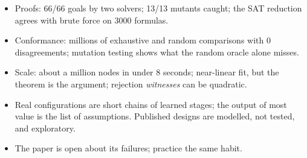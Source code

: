 \begin{recap}
\begin{itemize}
\item Proofs: 66/66 goals by two solvers; 13/13 mutants caught; the SAT reduction agrees with brute force on 3000 formulas.
\item Conformance: millions of exhaustive and random comparisons with 0 disagreements; mutation testing shows what the random oracle alone misses.
\item Scale: about a million nodes in under 8 seconds; near-linear fit, but the theorem is the argument; rejection \emph{witnesses} can be quadratic.
\item Real configurations are short chains of learned stages; the output of most value is the list of assumptions. Published designs are modelled, not tested, and exploratory.
\item The paper is open about its failures; practice the same habit.
\end{itemize}
\end{recap}
